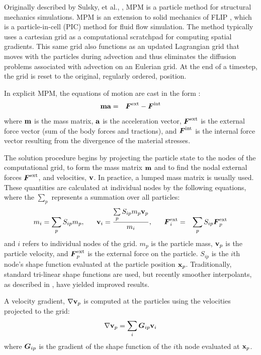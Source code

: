 Originally described by Sulsky, et al., \cite{Sulsky1994,Sulsky1995}, 
MPM is a particle method for structural mechanics simulations.  MPM is an 
extension to solid mechanics of FLIP \cite{brackbill-ruppel86}, which is a 
particle-in-cell (PIC) method for fluid flow simulation.  The method typically
uses a cartesian grid as a computational scratchpad for computing
spatial gradients.  This same grid also functions as an updated Lagrangian grid
that moves with the particles during advection and thus eliminates the
diffusion problems associated with advection on an Eulerian grid.  At the end
of a timestep, the grid is reset to the original, regularly ordered, position.

In explicit MPM, the equations of motion are cast in the form \cite{Sulsky1995}:
\begin{eqnarray}
        \mathbf{m} \mathbf{a} &=& \boldsymbol{F}^{\rm{ext}} - \boldsymbol{F}^{\rm{int}}  \label{newton2}
\end{eqnarray}
where $\mathbf{m}$ is the mass matrix, $\mathbf{a}$ is the acceleration vector,
$\boldsymbol{F}^{\rm{ext}}$ is the external force vector (sum of the body forces and
tractions), and $\boldsymbol{F}^{\rm{int}}$ is the internal force vector resulting from
the divergence of the material stresses.

The solution procedure begins by projecting the particle state to the
nodes of the computational grid, to form the mass matrix $\mathbf{m}$ and to find
the nodal external forces $\boldsymbol{F}^{\rm{ext}}$, and velocities,
$\mathbf{v}$.  In practice, a lumped mass matrix is usually used.
These quantities are calculated at individual nodes by the following 
equations, where the $\sum\limits_{p}$ represents a summation over all 
particles:
\begin{eqnarray}
m_i = \sum_{p} S_{ip} m_p,  \;\;\;\;\;\; 
\mathbf{v}_i = \frac{\sum\limits_{p} S_{ip} m_p \mathbf{v}_p}{m_i},  \;\;\;\;\;\;
\boldsymbol{F}^{\text{ext}}_i &=& \sum_{p} S_{ip} \boldsymbol{F}^{\text{ext}}_p
\label{interpolate}
\end{eqnarray}
and $i$ refers to individual nodes of the grid.  $m_p$ is the particle
mass, $\mathbf{v}_p$ is the particle velocity, and $\boldsymbol{F}^{\text{ext}}_p$ is the external
force on the particle.
$S_{ip}$ is the $i$th node's shape function evaluated at the particle position $\mathbf{x}_p$.
Traditionally, standard tri-linear shape functions are used, but recently
smoother interpolants, as described in \cite{Bard2004}, have yielded
improved results.

A velocity gradient,  $\nabla \mathbf{v}_p$ is computed at
the particles using the velocities projected to the grid:
\begin{equation}
\nabla \mathbf{v}_p = \sum_i \boldsymbol{G}_{ip} \mathbf{v}_i
\label{velgrad}
\end{equation}
where $\boldsymbol{G}_{ip}$ is the gradient of the shape function of the $i$th node
evaluated at $\mathbf{x}_p$.

